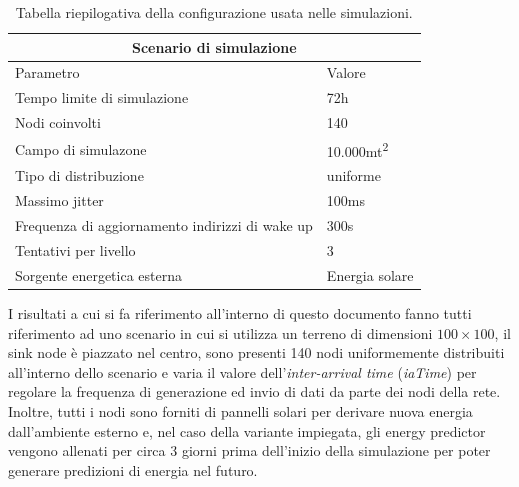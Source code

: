 \documentclass{report}
\begin{document}
\begin{table}[hb]
    \centering
    \begin{tabular}{ |p{7.5cm}|p{3cm}|  }
        \hline
        \multicolumn{2}{|c|}{Scenario di simulazione}                                 \\
        \hline
        Parametro                                       & Valore                      \\
        \hline
        Tempo limite di simulazione                     & 72h                         \\
        Nodi coinvolti                                  & 140                         \\
        Campo di simulazone                             & 10.000mt\textsuperscript{2} \\
        Tipo di distribuzione                           & uniforme                    \\
        Massimo jitter                                  & 100ms                       \\
        Frequenza di aggiornamento indirizzi di wake up & 300s                        \\
        Tentativi per livello                           & 3                           \\
        Sorgente energetica esterna                     & Energia solare              \\
        \hline
    \end{tabular}
    \caption{Tabella riepilogativa della configurazione usata nelle simulazioni.}
\end{table}

I risultati a cui si fa riferimento all'interno di questo documento fanno tutti riferimento ad uno scenario in cui si utilizza un terreno di dimensioni
$100 \times 100$, il sink node è piazzato nel centro, sono presenti 140 nodi uniformemente distribuiti all'interno dello scenario e varia il valore
dell'\emph{inter-arrival time} (\emph{iaTime}) per regolare la frequenza di generazione ed invio di dati da parte dei nodi della rete. Inoltre, tutti
i nodi sono forniti di pannelli solari per derivare nuova energia dall'ambiente esterno e, nel caso della variante impiegata, gli energy predictor
vengono allenati per circa 3 giorni prima dell'inizio della simulazione per poter generare predizioni di energia nel futuro.\\
\end{document}
